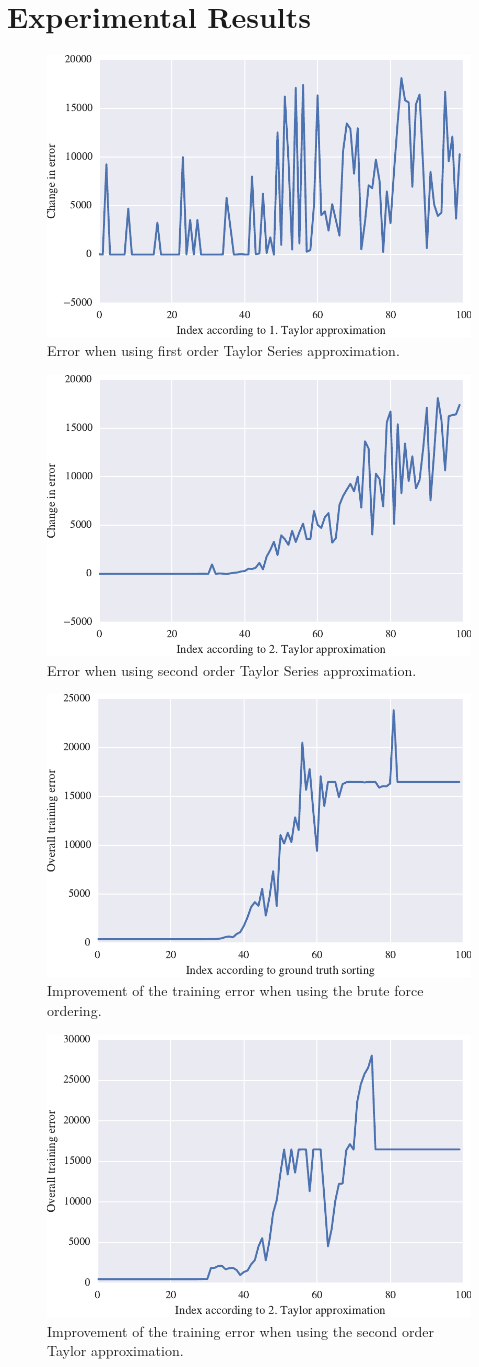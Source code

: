\section{Experimental Results}

\begin{figure}
\centering
\includegraphics[width=0.6\linewidth]{error1.pdf}
\caption{Error when using first order Taylor Series approximation.}
\label{fig:error1}
\end{figure}

\begin{figure}
\centering
\includegraphics[width=0.6\linewidth]{error2.pdf}
\caption{Error when using second order Taylor Series approximation.}
\label{fig:error2}
\end{figure}

\begin{figure}
\centering
\includegraphics[width=0.6\linewidth]{improvement1.pdf}
\caption{Improvement of the training error when using the brute force ordering.}
\label{fig:improvement1}
\end{figure}

\begin{figure}
\centering
\includegraphics[width=0.6\linewidth]{improvement3.pdf}
\caption{Improvement of the training error when using the second order Taylor approximation.}
\label{fig:improvement3}
\end{figure}
